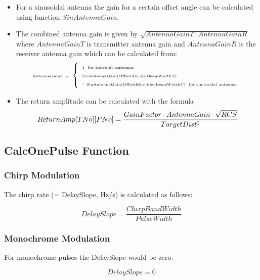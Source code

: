 \begin{itemize}
\item  For a sinusoidal antenna the gain for a certain offset angle can be
calculated using function $SinAntennaGain$.

\item  The combined antenna gain is given by $\sqrt{AntennaGainT\cdot
AntennaGainR}$ where $AntennaGainT$ is transmitter antenna gain and $%
AntennaGainR$ is the receiver antenna gain which can be calculated from: 
\begin{equation}
\text{{\tiny AntennaGainT =} }\left\{ 
\begin{array}{l}
\text{{\tiny 1~ for isotropic antennas}} \\ 
\text{{\tiny SinAntennaGain(OffsetAzi,AziBeamWidthT)}} \\ 
\cdot ~\text{{\tiny SinAntennaGain(OffsetElev,ElevBeamWidthT)~ for
sinusoidal antennas}}
\end{array}
\right. 
\end{equation}

\item  The return amplitude can be calculated with the formula 
\begin{equation}
ReturnAmp[TNo][PNo]=\frac{GainFactor\cdot AntennaGain\cdot \sqrt{RCS}}{%
TargetDist^{2}}
\end{equation}
\end{itemize}

\subsection{CalcOnePulse Function}

\subsubsection{Chirp Modulation}

The chirp rate (= DelaySlope, Hz/s) is calculated as follows:

\begin{equation}
DelaySlope=\frac{ChirpBandWidth}{PulseWidth}
\end{equation}

\subsubsection{Monochrome Modulation}

For monochrome pulses the DelaySlope would be zero.

\begin{equation}
DelaySlope=0
\end{equation}

